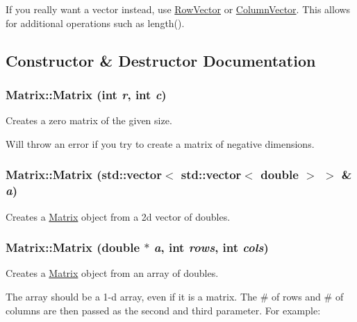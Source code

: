 If you really want a vector instead, use \hyperlink{class_row_vector}{RowVector} or \hyperlink{class_column_vector}{ColumnVector}. This allows for additional operations such as length(). 

\subsection{Constructor \& Destructor Documentation}
\hypertarget{class_matrix_a07a3cee5bc286ca27ceffe81ce5a2d01}{
\subsubsection[{Matrix}]{\setlength{\rightskip}{0pt plus 5cm}Matrix::Matrix (int {\em r}, \/  int {\em c})}}
\label{class_matrix_a07a3cee5bc286ca27ceffe81ce5a2d01}


Creates a zero matrix of the given size. 

Will throw an error if you try to create a matrix of negative dimensions. \hypertarget{class_matrix_a0db283ef4ea2660f8d0c1b58f9e74f49}{
\subsubsection[{Matrix}]{\setlength{\rightskip}{0pt plus 5cm}Matrix::Matrix (std::vector$<$ std::vector$<$ double $>$ $>$ \& {\em a})}}
\label{class_matrix_a0db283ef4ea2660f8d0c1b58f9e74f49}


Creates a \hyperlink{class_matrix}{Matrix} object from a 2d vector of doubles. 

\hypertarget{class_matrix_a3179cefb929e09cbdc95d143e1d9e3d2}{
\subsubsection[{Matrix}]{\setlength{\rightskip}{0pt plus 5cm}Matrix::Matrix (double $\ast$ {\em a}, \/  int {\em rows}, \/  int {\em cols})}}
\label{class_matrix_a3179cefb929e09cbdc95d143e1d9e3d2}


Creates a \hyperlink{class_matrix}{Matrix} object from an array of doubles. 

The array should be a 1-\/d array, even if it is a matrix. The \# of rows and \# of columns are then passed as the second and third parameter. For example:


